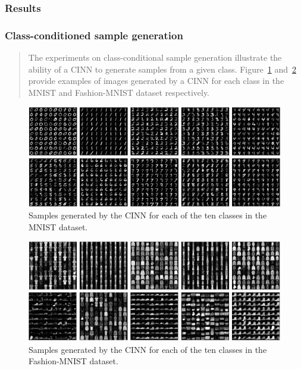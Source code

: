 \subsubsection{Results}

\subsubsection*{Class-conditioned sample generation} 
\begin{quote}
The experiments on class-conditional sample generation illustrate the ability of a CINN to generate samples from a given class.  Figure~\ref{fig:exp_class_cond_MNIST} and~\ref{fig:exp_class_cond_FashionMNIST} provide examples of images generated by a CINN for each class in the MNIST and Fashion-MNIST dataset respectively. 
\end{quote}

\begin{figure}[h]
    \centering
    \caption{\label{fig:exp_class_cond_MNIST} Samples generated by the CINN for each of the ten classes in the MNIST dataset.}
    \vspace{-0.15in}
    \includegraphics[width=0.95\columnwidth]{fig_datasynth/class_conditional_generation_MNIST.png} 
\end{figure}

\begin{figure}[h]
    \centering
    \caption{\label{fig:exp_class_cond_FashionMNIST} Samples generated by the CINN for each of the ten classes in the Fashion-MNIST dataset.}
    \vspace{-0.15in}
    \includegraphics[width=0.95\columnwidth]{fig_datasynth/class_conditional_generation_Fashion-MNIST.png}     
\end{figure}    


